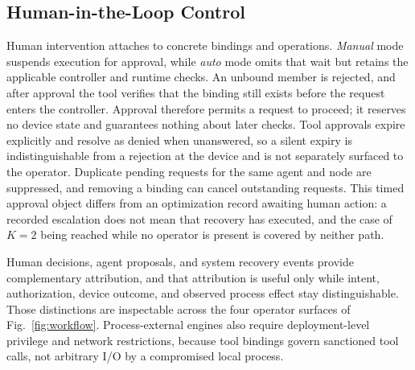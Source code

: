\subsection{Human-in-the-Loop Control}
\label{sec:hitl}
Human intervention attaches to concrete bindings and operations. \emph{Manual} mode
suspends execution for approval, while \emph{auto} mode omits that wait but retains
the applicable controller and runtime checks. An unbound member is rejected, and
after approval the tool verifies that the binding still exists before the request
enters the controller. Approval therefore permits a request to proceed; it reserves
no device state and guarantees nothing about later checks. Tool approvals expire
explicitly and resolve as denied when unanswered, so a silent expiry is
indistinguishable from a rejection at the device and is not separately surfaced to
the operator. Duplicate pending requests for the same agent and node are
suppressed, and removing a binding can cancel outstanding requests. This timed
approval object differs from an optimization record awaiting human action: a
recorded escalation does not mean that recovery has executed, and the case of $K=2$
being reached while no operator is present is covered by neither path.

Human decisions, agent proposals, and system recovery events provide complementary
attribution, and that attribution is useful only while intent, authorization,
device outcome, and observed process effect stay distinguishable. Those distinctions
are inspectable across the four operator surfaces of Fig.~\ref{fig:workflow}.
Process-external engines also require deployment-level privilege and network
restrictions, because tool bindings govern sanctioned tool calls, not arbitrary I/O
by a compromised local process.
